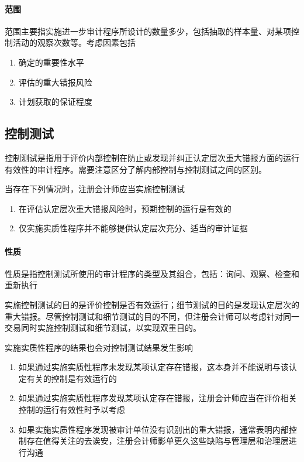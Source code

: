 \documentclass[UTF8,12pt]{ctexart}
\numberwithin{equation}{section} %
\numberwithin{figure}{section}
\numberwithin{table}{section}
\begin{document}
	\paragraph{范围}
	范围主要指实施进一步审计程序所设计的数量多少，包括抽取的样本量、对某项控制活动的观察次数等。考虑因素包括
	\begin{enumerate}
		\item 确定的重要性水平
		
		\item 评估的重大错报风险
		
		\item 计划获取的保证程度
	\end{enumerate}
	
	\subsection{控制测试}
	控制测试是指用于评价内部控制在防止或发现并纠正认定层次重大错报方面的运行有效性的审计程序。需要注意区分了解内部控制与控制测试之间的区别。
	
	当存在下列情况时，注册会计师应当实施控制测试
	\begin{enumerate}
		\item 在评估认定层次重大错报风险时，预期控制的运行是有效的
		
		\item 仅实施实质性程序并不能够提供认定层次充分、适当的审计证据
	\end{enumerate}
	
	\paragraph{性质}
	性质是指控制测试所使用的审计程序的类型及其组合，包括：询问、观察、检查和重新执行
	
	实施控制测试的目的是评价控制是否有效运行；细节测试的目的是发现认定层次的重大错报。尽管控制测试和细节测试的目的不同，但注册会计师可以考虑针对同一交易同时实施控制测试和细节测试，以实现双重目的。
	
	实施实质性程序的结果也会对控制测试结果发生影响
	\begin{enumerate}
		\item 如果通过实施实质性程序未发现某项认定存在错报，这本身并不能说明与该认定有关的控制是有效运行的
		
		\item 如果通过实施实质性程序发现某项认定存在错报，注册会计师应当在评价相关控制的运行有效性时予以考虑
		
		\item 如果实施实质性程序发现被审计单位没有识别出的重大错报，通常表明内部控制存在值得关注的去诶安，注册会计师影单更久这些缺陷与管理层和治理层进行沟通
	\end{enumerate}
	
\end{document}
